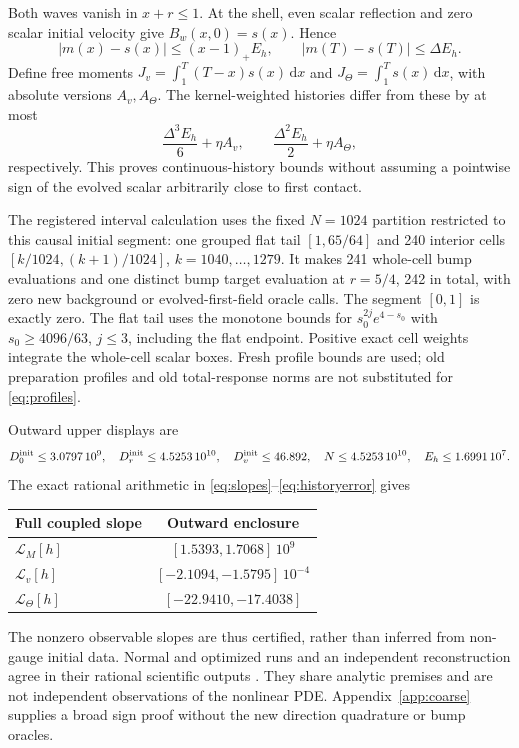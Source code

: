 \documentclass[11pt]{article}
\newcommand{\dd}{\mathrm d}
\begin{document}
Both waves vanish in $x+r\le1$. At the shell, even scalar reflection and
zero scalar initial velocity give $B_w(x,0)=s(x)$. Hence
\begin{equation}
 |m(x)-s(x)|\le(x-1)_+E_h,\qquad
 |m(T)-s(T)|\le\Delta E_h. \label{eq:shellerror}
\end{equation}
Define free moments $J_v=\int_1^T(T-x)s(x)\,\dd x$ and
$J_\Theta=\int_1^Ts(x)\,\dd x$, with absolute versions $A_v,A_\Theta$.
The kernel-weighted histories differ from these by at most
\begin{equation}
 \frac{\Delta^3E_h}{6}+\eta A_v,\qquad
 \frac{\Delta^2E_h}{2}+\eta A_\Theta, \label{eq:historyerror}
\end{equation}
respectively. This proves continuous-history bounds without assuming a
pointwise sign of the evolved scalar arbitrarily close to first contact.

The registered interval calculation uses the fixed $N=1024$ partition
restricted to this causal initial segment: one grouped flat tail
$[1,65/64]$ and 240 interior cells
$[k/1024,(k+1)/1024]$, $k=1040,\ldots,1279$. It makes 241 whole-cell
bump evaluations and one distinct bump target evaluation at $r=5/4$,
242 in total, with zero new background or evolved-first-field oracle
calls. The segment $[0,1]$ is exactly zero. The flat tail uses the
monotone bounds for $s_0^{2j}e^{4-s_0}$ with
$s_0\ge4096/63$, $j\le3$, including the flat endpoint. Positive exact
cell weights integrate the whole-cell scalar boxes. Fresh profile bounds
are used; old preparation profiles and old total-response norms are not
substituted for \eqref{eq:profiles}.

Outward upper displays are
\begin{equation}
 D_0^{\rm init}\le3.0797\,10^9,\quad D_r^{\rm init}\le4.5253\,10^{10},
 \quad D_v^{\rm init}\le46.892,\quad N\le4.5253\,10^{10},
 \quad E_h\le1.6991\,10^7. \label{eq:numericnorms}
\end{equation}
The exact rational arithmetic in \eqref{eq:slopes}--\eqref{eq:historyerror}
gives
\begin{center}
\begin{tabular}{@{}lc@{}}\toprule
Full coupled slope & Outward enclosure\\\midrule
$\mathcal L_M[h]$ & $[1.5393,1.7068]\,10^9$\\
$\mathcal L_v[h]$ & $[-2.1094,-1.5795]\,10^{-4}$\\
$\mathcal L_\Theta[h]$ & $[-22.9410,-17.4038]$\\\bottomrule
\end{tabular}
\end{center}
The nonzero observable slopes are thus certified, rather than inferred
from non-gauge initial data. Normal and optimized runs and an independent
reconstruction agree in their rational scientific outputs \cite{records}.
They share analytic premises and are not independent observations of the
nonlinear PDE. Appendix~\ref{app:coarse} supplies a broad sign proof
without the new direction quadrature or bump oracles.
\end{document}
